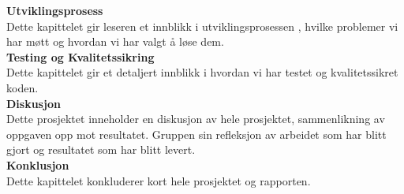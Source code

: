 \textbf{Utviklingsprosess}\\
Dette kapittelet gir leseren et innblikk i utviklingsprosessen , hvilke problemer vi har møtt og hvordan vi har valgt å løse dem.\\

\textbf{Testing og Kvalitetssikring}\\
	Dette kapittelet gir et detaljert innblikk i hvordan vi har testet og kvalitetssikret koden.\\

\textbf{Diskusjon}\\
Dette prosjektet inneholder en diskusjon av hele prosjektet, sammenlikning av oppgaven opp mot resultatet. Gruppen sin refleksjon av arbeidet som har blitt gjort og resultatet som har blitt levert.\\

\textbf{Konklusjon}\\
	Dette kapittelet konkluderer kort hele prosjektet og rapporten.\\





  